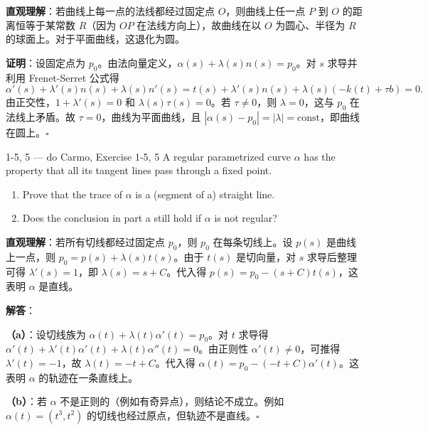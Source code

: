 \begin{solution}
\textbf{直观理解}：若曲线上每一点的法线都经过固定点 $O$，则曲线上任一点 $P$ 到 $O$ 的距离恒等于某常数 $R$（因为 $OP$ 在法线方向上），故曲线在以 $O$ 为圆心、半径为 $R$ 的球面上。对于平面曲线，这退化为圆。

\textbf{证明}：设固定点为 $p_0$。由法向量定义，$\alpha(s) + \lambda(s)n(s) = p_0$。对 $s$ 求导并利用 Frenet-Serret 公式得
\[
\alpha'(s) + \lambda'(s)n(s) + \lambda(s)n'(s) = t(s) + \lambda'(s)n(s) + \lambda(s)(-k(t) + \tau b) = 0.
\]
由正交性，$1 + \lambda'(s) = 0$ 和 $\lambda(s)\tau(s) = 0$。若 $\tau \neq 0$，则 $\lambda = 0$，这与 $p_0$ 在法线上矛盾。故 $\tau = 0$，曲线为平面曲线，且 $|\alpha(s)-p_0| = |\lambda| = \text{const}$，即曲线在圆上。$\square$
\end{solution}

\begin{exercise}{1-5, 5 — do Carmo, Exercise 1-5, 5}
A regular parametrized curve $\alpha$ has the property that all its tangent lines pass through a fixed point.
\begin{enumerate}
\item[a.] Prove that the trace of $\alpha$ is a (segment of a) straight line.
\item[b.] Does the conclusion in part a still hold if $\alpha$ is not regular?
\end{enumerate}
\end{exercise}

\begin{solution}
\textbf{直观理解}：若所有切线都经过固定点 $p_0$，则 $p_0$ 在每条切线上。设 $p(s)$ 是曲线上一点，则 $p_0 = p(s) + \lambda(s)t(s)$。由于 $t(s)$ 是切向量，对 $s$ 求导后整理可得 $\lambda'(s) = 1$，即 $\lambda(s) = s + C$。代入得 $p(s) = p_0 - (s+C)t(s)$，这表明 $\alpha$ 是直线。

\textbf{解答}：

\textbf{（a）}：设切线族为 $\alpha(t) + \lambda(t)\alpha'(t) = p_0$。对 $t$ 求导得 $\alpha'(t) + \lambda'(t)\alpha'(t) + \lambda(t)\alpha''(t) = 0$。由正则性 $\alpha'(t) \neq 0$，可推得 $\lambda'(t) = -1$，故 $\lambda(t) = -t + C$。代入得 $\alpha(t) = p_0 - (-t+C)\alpha'(t)$。这表明 $\alpha$ 的轨迹在一条直线上。

\textbf{（b）}：若 $\alpha$ 不是正则的（例如有奇异点），则结论不成立。例如 $\alpha(t) = (t^3, t^2)$ 的切线也经过原点，但轨迹不是直线。$\square$
\end{solution}

